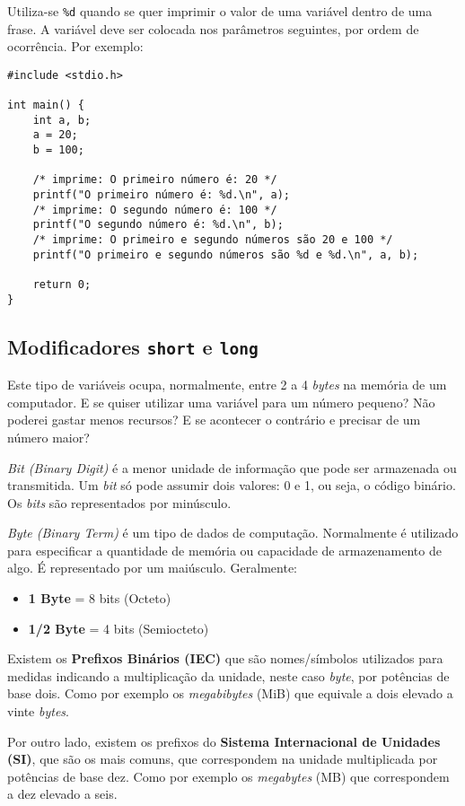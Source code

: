 Utiliza-se \texttt{\%d} quando se quer imprimir o valor de uma variável dentro de uma frase. A variável deve ser colocada nos parâmetros seguintes, por ordem de ocorrência. Por exemplo:

\begin{lstlisting}
#include <stdio.h>
 
int main() {
    int a, b;
    a = 20;
    b = 100;
 	
    /* imprime: O primeiro número é: 20 */
    printf("O primeiro número é: %d.\n", a); 
    /* imprime: O segundo número é: 100 */
    printf("O segundo número é: %d.\n", b); 
    /* imprime: O primeiro e segundo números são 20 e 100 */
    printf("O primeiro e segundo números são %d e %d.\n", a, b); 
  
    return 0;
}
\end{lstlisting}

\subsection{Modificadores \texttt{short} e \texttt{long}}

Este tipo de variáveis ocupa, normalmente, entre 2 a 4 \textit{bytes} na memória de um computador. E se quiser utilizar uma variável para um número pequeno? Não poderei gastar menos recursos? E se acontecer o contrário e precisar de um número maior?

\begin{mdframed}[backgroundcolor=cinzaclaro, linewidth=0pt]

\textit{Bit (Binary Digit)} é a menor unidade de informação que pode ser armazenada ou transmitida. Um \textit{bit} só pode assumir dois valores: 0 e 1, ou seja, o código binário. Os \textit{bits} são representados por  minúsculo.

\textit{Byte (Binary Term)} é um tipo de dados de computação. Normalmente é utilizado para especificar a quantidade de memória ou capacidade de armazenamento de algo. É representado por um  maiúsculo. Geralmente:

\begin{itemize}
\item \textbf{1 Byte} = 8 bits (Octeto)
\item \textbf{1/2 Byte} = 4 bits (Semiocteto)
\end{itemize}

Existem os \textbf{Prefixos Binários (IEC)} que são nomes/símbolos utilizados para medidas indicando a multiplicação da unidade, neste caso \textit{byte}, por potências de base dois. Como por exemplo os \textit{megabibytes} (MiB) que equivale a dois elevado a vinte \textit{bytes}.

Por outro lado, existem os prefixos do \textbf{Sistema Internacional de Unidades (SI)}, que são os mais comuns, que correspondem na unidade multiplicada por potências de base dez. Como por exemplo os \textit{megabytes} (MB) que correspondem a dez elevado a seis.
\end{mdframed}


